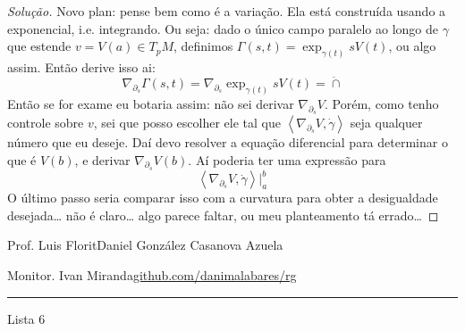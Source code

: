 \begin{proof}[Solução]
Novo plan: pense bem como é a variação. Ela está construída usando a exponencial, i.e. integrando. Ou seja: dado o único campo paralelo ao longo de \(\gamma\) que estende \(v=V(a)\in T_pM\), definimos \(\Gamma(s,t)=\operatorname{exp}_{\gamma(t)}sV(t)\), ou algo assim. Então derive isso ai:
\[\nabla_{\partial_s}\Gamma(s,t)=\nabla_{\partial_s}\operatorname{exp}_{\gamma(t)}sV(t)=\ddot \cap\]
Então se for exame eu botaria assim: não sei derivar \(\nabla_{\partial_s}V\). Porém, como tenho controle sobre \(v\), sei que posso escolher ele tal que \(\left<\nabla_{\partial_s}V,\dot \gamma\right>\) seja qualquer número que eu deseje. Daí devo resolver a equação diferencial para determinar o que é \(V(b)\), e derivar \(\nabla_{\partial_s}V(b)\). Aí poderia ter uma expressão para
\[\left<\nabla_{\partial_s}V,\dot \gamma\right>|_{a}^b\]
O último passo seria comparar isso com a curvatura para obter a desigualdade desejada… não é claro… algo parece faltar, ou meu planteamento tá errado…

\end{proof}
\fi

\clearpage
\begin{minipage}{\textwidth}
	\begin{minipage}{1\textwidth}
		{\small Prof. Luis Florit\hfill Daniel González Casanova Azuela}
		
		{\small Monitor. Ivan Miranda\hfill\href{https://github.com/danimalabares/rg}{github.com/danimalabares/rg}}
	\end{minipage}
\end{minipage}\vspace{.2cm}\hrule

\vspace{10pt}
{\huge Lista 6}

